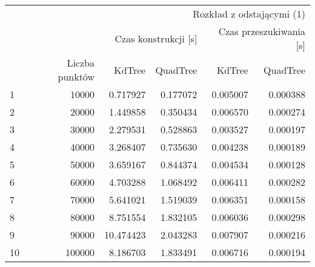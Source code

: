 \begin{tabular}{lrrrrr}
\toprule
 & \multicolumn{5}{r}{Rozkład z odstającymi (1)} \\
 &  & \multicolumn{2}{r}{Czas konstrukcji [s]} & \multicolumn{2}{r}{Czas przeszukiwania [s]} \\
 & Liczba punktów & KdTree & QuadTree & KdTree & QuadTree \\
\midrule
1 & 10000 & 0.717927 & 0.177072 & 0.005007 & 0.000388 \\
2 & 20000 & 1.449858 & 0.350434 & 0.006570 & 0.000274 \\
3 & 30000 & 2.279531 & 0.528863 & 0.003527 & 0.000197 \\
4 & 40000 & 3.268407 & 0.735630 & 0.004238 & 0.000189 \\
5 & 50000 & 3.659167 & 0.844374 & 0.004534 & 0.000128 \\
6 & 60000 & 4.703288 & 1.068492 & 0.006411 & 0.000282 \\
7 & 70000 & 5.641021 & 1.519039 & 0.006351 & 0.000158 \\
8 & 80000 & 8.751554 & 1.832105 & 0.006036 & 0.000298 \\
9 & 90000 & 10.474423 & 2.043283 & 0.007907 & 0.000216 \\
10 & 100000 & 8.186703 & 1.833491 & 0.006716 & 0.000194 \\
\bottomrule
\end{tabular}
